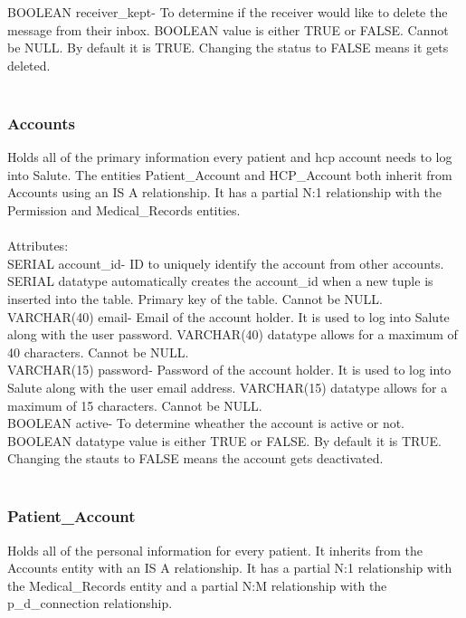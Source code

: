 \documentclass[12pt]{report}
\begin{document}
BOOLEAN receiver\_kept- To determine if the receiver would like to delete the message from their inbox.  BOOLEAN value is either TRUE or FALSE.  Cannot be NULL.  By default it is TRUE.  Changing the status to FALSE means it gets deleted.\\ \\

\subsubsection{Accounts}
Holds all of the primary information every patient and hcp account needs to log into Salute.  The entities Patient\_Account and HCP\_Account both inherit from Accounts using an IS A relationship.  It has a partial N:1 relationship with the Permission and Medical\_Records entities.\\ \\

Attributes:\\
SERIAL account\_id- ID to uniquely identify the account from other accounts. SERIAL datatype automatically creates the account\_id when a new tuple is inserted into the table.  Primary key of the table.  Cannot be NULL.\\

VARCHAR(40) email- Email of the account holder. It is used to log into Salute along with the user password.  VARCHAR(40) datatype allows for a maximum of 40 characters.  Cannot be NULL.\\

VARCHAR(15) password-  Password of the account holder.  It is used to log into Salute along with the user email address.  VARCHAR(15) datatype allows for a maximum of 15 characters.  Cannot be NULL.\\

BOOLEAN active- To determine wheather the account is active or not.  BOOLEAN datatype value is either TRUE or FALSE.  By default it is TRUE.  Changing the stauts to FALSE means the account gets deactivated.\\  \\

\subsubsection{Patient\_Account}
Holds all of the personal information for every patient.  It inherits from the Accounts entity with an IS A relationship.  It has a partial N:1 relationship with the Medical\_Records entity and a partial N:M relationship with the p\_d\_connection relationship.\\ \\
\end{document}
